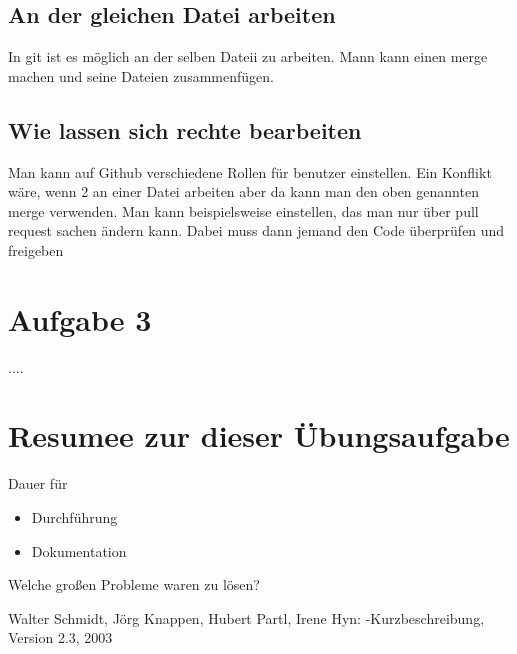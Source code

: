 \documentclass[a4paper,11pt,titlepage]{article}
\begin{document}
\subsection{An der gleichen Datei arbeiten}
In git ist es möglich an der selben Dateii zu arbeiten. Mann kann einen merge machen und seine Dateien zusammenfügen.

\subsection{Wie lassen sich rechte bearbeiten}
Man kann auf Github verschiedene Rollen für benutzer einstellen. Ein Konflikt wäre, wenn 2 an einer Datei arbeiten aber da kann man den oben genannten merge verwenden. Man kann beispielsweise einstellen, das man nur über pull request sachen ändern kann. Dabei muss dann jemand den Code überprüfen und freigeben


\section{Aufgabe 3}
....

\section{Resumee zur dieser \"Ubungsaufgabe}
Dauer f\"ur 
\begin{itemize}
	\item Durchf\"uhrung
	\item Dokumentation
\end{itemize}
Welche großen Probleme waren zu l\"osen?

\begin{thebibliography}{99}
	Walter Schmidt, J\"org Knappen, Hubert Partl, Irene Hyn: 
\LaTeXe-Kurzbeschreibung, 	Version 2.3, 2003
	

\end{thebibliography}
\end{document}
